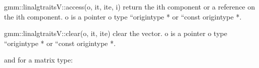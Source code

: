 \documentclass[a4paper,11pt,english]{sphinxmanual}
\begin{document}
\begin{sphinxVerbatim}[commandchars=\\\{\}]
gmm::linalg\PYGZus{}traits\PYGZlt{}V\PYGZgt{}::access(o, it, ite, i) \PYGZhy{}\PYGZhy{}\PYGZgt{} return the ith component or a
                                        reference on the ith component. o is a
                                        pointer o type ``origin\PYGZus{}type *\PYGZsq{}\PYGZsq{} or
                                        ``const origin\PYGZus{}type *\PYGZsq{}\PYGZsq{}.

gmm::linalg\PYGZus{}traits\PYGZlt{}V\PYGZgt{}::clear(o, it, ite) \PYGZhy{}\PYGZhy{}\PYGZgt{} clear the vector. o is a
                                        pointer o type ``origin\PYGZus{}type *\PYGZsq{}\PYGZsq{} or
                                        ``const origin\PYGZus{}type *\PYGZsq{}\PYGZsq{}.
\end{sphinxVerbatim}

\sphinxAtStartPar
and for a matrix type:
\end{document}
